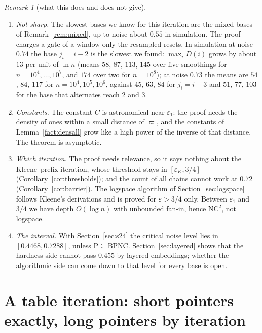 \documentclass[11pt]{amsart}
\theoremstyle{definition}
\theoremstyle{remark}
\newtheorem{remark}[theorem]{Remark}
\newcommand{\eps}{\varepsilon}
\begin{document}
\begin{remark}[what this does and does not give]
\begin{enumerate}[label=(\roman*),leftmargin=2.4em]
$0.7208$ for bases all of whose pointers have reach $1$, $2$ or at least $5$, and about $0.7185$
in the limit of long pointers (floating point; we have not written this out; the referee of this
section found the same numbers). To use it for every base one would need a count for the pointers
of reach $3$ and $4$ in the manner of~\eqref{eq:reachtwo}. So this route ends near $0.72$.
\item \emph{Not sharp.} The slowest bases we know for this iteration are the mixed bases of
Remark~\ref{rem:mixed}, up to noise about $0.55$ in simulation. The proof charges a gate of a
window only the resampled resets. In simulation at noise $0.74$ the base $j_i=i-2$ is the slowest
we found: $\max_iD(i)$ grows by about $13$ per unit of $\ln n$ (means $58$, $87$, $113$, $145$
over five smoothings for $n=10^4,\dots,10^7$, and $174$ over two for $n=10^8$); at noise $0.73$
the means are $54$, $84$, $117$ for $n=10^4,10^5,10^6$, against $45$, $63$, $84$ for $j_i=i-3$ and
$51$, $77$, $103$ for the base that alternates reach $2$ and $3$.
\item \emph{Constants.} The constant $C$ is astronomical near $\eps_1$: the proof needs the density
of ones within a small distance of $\varpi$, and the constants of Lemma~\ref{fact:densall} grow
like a high power of the inverse of that distance. The theorem is asymptotic.
\item \emph{Which iteration.} The proof needs relevance, so it says nothing about the
Kleene--prefix iteration, whose threshold stays in $[\eps_K,3/4]$
(Corollary~\ref{cor:thresholds}); and the count of all chains cannot work at $0.72$
(Corollary~\ref{cor:barrier}). The logspace algorithm of Section~\ref{sec:logspace} follows
Kleene's derivations and is proved for $\eps>3/4$ only. Between $\eps_1$ and $3/4$ we have depth
$O(\log n)$ with unbounded fan-in, hence $\mathrm{NC}^2$, not logspace.
\item \emph{The interval.} With Section~\ref{sec:s24} the critical noise level lies in
$[0.4468,0.7288]$, unless $\mathrm P\subseteq\mathrm{BPNC}$. Section~\ref{sec:layered} shows that the
hardness side cannot pass $0.455$ by layered embeddings; whether the algorithmic side can come
down to that level for every base is open.
\end{enumerate}
\end{remark}

\section{A table iteration: short pointers exactly, long pointers by iteration}\label{sec:table}
\end{document}
